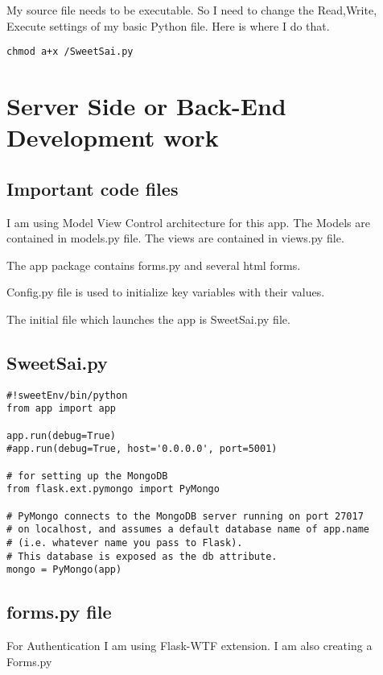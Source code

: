 \documentclass[11pt]{article}
\begin{document}
My source file needs to be executable. So I need to change the
Read,Write, Execute settings of my basic Python file. Here is where I
do that.


\begin{verbatim}
chmod a+x /SweetSai.py
\end{verbatim}
\section{Server Side or Back-End Development work}
\label{sec-7}
\subsection{Important code files}
\label{sec-7-1}

I am using Model View Control architecture for this app. The Models
are contained in models.py file. The views are contained in views.py
file. 

The app package contains forms.py and several html forms. 

Config.py file is used to initialize key variables with their values.

The initial file which launches the app is SweetSai.py file.
\subsection{SweetSai.py}
\label{sec-7-2}


\begin{verbatim}
#!sweetEnv/bin/python
from app import app

app.run(debug=True)
#app.run(debug=True, host='0.0.0.0', port=5001)

# for setting up the MongoDB
from flask.ext.pymongo import PyMongo 

# PyMongo connects to the MongoDB server running on port 27017 
# on localhost, and assumes a default database name of app.name 
# (i.e. whatever name you pass to Flask). 
# This database is exposed as the db attribute.
mongo = PyMongo(app)
\end{verbatim}
\subsection{forms.py file}
\label{sec-7-3}

For Authentication I am using Flask-WTF extension. I am also creating a Forms.py
\end{document}

